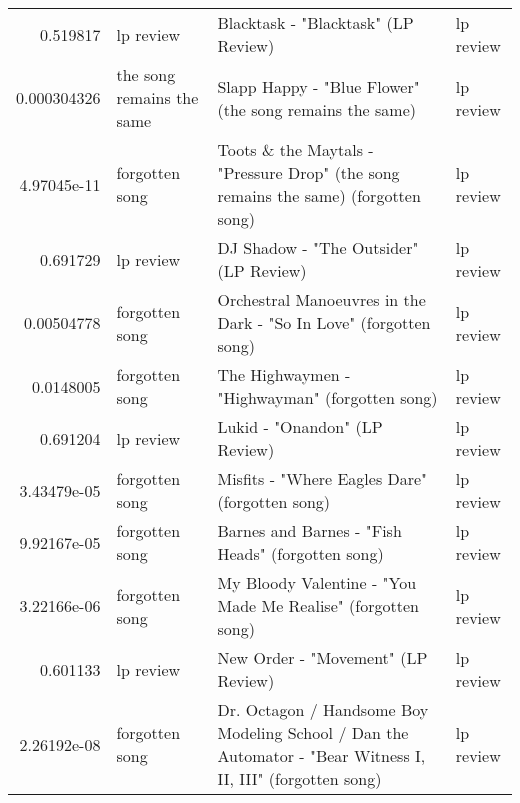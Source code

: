 \documentclass[letterpaper,10pt]{article}
\begin{document}
\begin{table}[H]
\begin{adjustbox}{max width=\linewidth}
\begin{tabular}{rlll}
  0.519817    & lp review                 & Blacktask - "Blacktask" (LP Review)                                                                          & lp review                 \\
  0.000304326 & the song remains the same & Slapp Happy - "Blue Flower"  (the song remains the same)                                                     & lp review                 \\
  4.97045e-11 & forgotten song            & Toots \& the Maytals - "Pressure Drop"  (the song remains the same) (forgotten song)                          & lp review                 \\
  0.691729    & lp review                 & DJ Shadow - "The Outsider"  (LP Review)                                                                      & lp review                 \\
  0.00504778  & forgotten song            & Orchestral Manoeuvres in the Dark - "So In Love"  (forgotten song)                                           & lp review                 \\
  0.0148005   & forgotten song            & The Highwaymen - "Highwayman"  (forgotten song)                                                              & lp review                 \\
  0.691204    & lp review                 & Lukid - "Onandon"  (LP Review)                                                                               & lp review                 \\
  3.43479e-05 & forgotten song            & Misfits - "Where Eagles Dare"  (forgotten song)                                                              & lp review                 \\
  9.92167e-05 & forgotten song            & Barnes and Barnes - "Fish Heads"  (forgotten song)                                                           & lp review                 \\
  3.22166e-06 & forgotten song            & My Bloody Valentine - "You Made Me Realise"  (forgotten song)                                                & lp review                 \\
  0.601133    & lp review                 & New Order - "Movement"  (LP Review)                                                                          & lp review                 \\
  2.26192e-08 & forgotten song            & Dr. Octagon / Handsome Boy Modeling School / Dan the Automator - "Bear Witness I, II, III"  (forgotten song) & lp review                 \\

\end{tabular}
\end{adjustbox}
\end{table}
\end{document}
